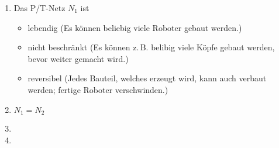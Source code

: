 \documentclass[a4paper]{scrartcl}
\begin{document}
\begin{enumerate}
    \item
        Das P/T-Netz $N_1$ ist
        \begin{itemize}
            \item lebendig (Es können beliebig viele Roboter gebaut werden.)
            \item nicht beschränkt (Es können z.\,B. belibig viele Köpfe gebaut
                werden, bevor weiter gemacht wird.)
            \item reversibel (Jedes Bauteil, welches erzeugt wird, kann auch
                verbaut werden; fertige Roboter verschwinden.)
        \end{itemize}

    \item
        $N_1 = N_2$

    \item

    \item

\end{enumerate}
\end{document}
